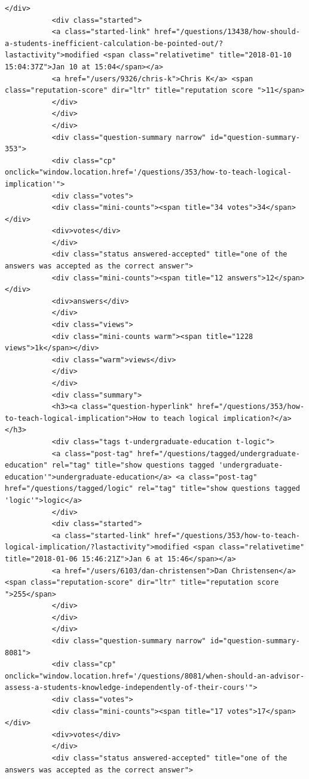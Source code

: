 \documentclass[11pt]{article}
\begin{document}
\begin{Verbatim}[commandchars=\\\{\}]
           </div>
           <div class="started">
           <a class="started-link" href="/questions/13438/how-should-a-students-inefficient-calculation-be-pointed-out/?lastactivity">modified <span class="relativetime" title="2018-01-10 15:04:37Z">Jan 10 at 15:04</span></a>
           <a href="/users/9326/chris-k">Chris K</a> <span class="reputation-score" dir="ltr" title="reputation score ">11</span>
           </div>
           </div>
           </div>
           <div class="question-summary narrow" id="question-summary-353">
           <div class="cp" onclick="window.location.href='/questions/353/how-to-teach-logical-implication'">
           <div class="votes">
           <div class="mini-counts"><span title="34 votes">34</span></div>
           <div>votes</div>
           </div>
           <div class="status answered-accepted" title="one of the answers was accepted as the correct answer">
           <div class="mini-counts"><span title="12 answers">12</span></div>
           <div>answers</div>
           </div>
           <div class="views">
           <div class="mini-counts warm"><span title="1228 views">1k</span></div>
           <div class="warm">views</div>
           </div>
           </div>
           <div class="summary">
           <h3><a class="question-hyperlink" href="/questions/353/how-to-teach-logical-implication">How to teach logical implication?</a></h3>
           <div class="tags t-undergraduate-education t-logic">
           <a class="post-tag" href="/questions/tagged/undergraduate-education" rel="tag" title="show questions tagged 'undergraduate-education'">undergraduate-education</a> <a class="post-tag" href="/questions/tagged/logic" rel="tag" title="show questions tagged 'logic'">logic</a>
           </div>
           <div class="started">
           <a class="started-link" href="/questions/353/how-to-teach-logical-implication/?lastactivity">modified <span class="relativetime" title="2018-01-06 15:46:21Z">Jan 6 at 15:46</span></a>
           <a href="/users/6103/dan-christensen">Dan Christensen</a> <span class="reputation-score" dir="ltr" title="reputation score ">255</span>
           </div>
           </div>
           </div>
           <div class="question-summary narrow" id="question-summary-8081">
           <div class="cp" onclick="window.location.href='/questions/8081/when-should-an-advisor-assess-a-students-knowledge-independently-of-their-cours'">
           <div class="votes">
           <div class="mini-counts"><span title="17 votes">17</span></div>
           <div>votes</div>
           </div>
           <div class="status answered-accepted" title="one of the answers was accepted as the correct answer">

\end{Verbatim}
\end{document}
